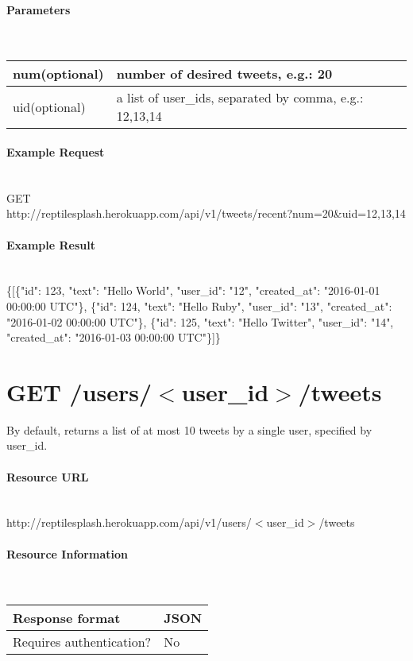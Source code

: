 \documentclass{article}
\begin{document}
	\paragraph{Parameters} \mbox{} \\
	\begin{tabular}{ll}
		\hline
		num(optional) & number of desired tweets, e.g.: 20 \\ \hline
		uid(optional) & a list of user\_ids, separated by comma, e.g.: 12,13,14 \\ \hline
	\end{tabular}
	\paragraph{Example Request} \mbox{} \\
	GET \\
	http://reptilesplash.herokuapp.com/api/v1/tweets/recent?num=20\&uid=12,13,14 
	\paragraph{Example Result} \mbox{} \\
	\{[\{"id": 123, "text": "Hello World", "user\_id": "12", "created\_at": "2016-01-01 00:00:00 UTC"\}, \{"id": 124, "text": "Hello Ruby", "user\_id": "13", "created\_at": "2016-01-02 00:00:00 UTC"\}, \{"id": 125, "text": "Hello Twitter", "user\_id": "14", "created\_at": "2016-01-03 00:00:00 UTC"\}]\}
	

	\section*{GET /users/$<$user\_id$>$/tweets}
	By default, returns a list of at most 10 tweets by a single user, specified by user\_id. 
	\paragraph{Resource URL} \mbox{} \\
	http://reptilesplash.herokuapp.com/api/v1/users/$<$user\_id$>$/tweets
	\paragraph{Resource Information} \mbox{} \\
	\begin{tabular}{ll}
		\hline
		Response format & JSON \\ \hline
		Requires authentication? & No \\ \hline
	\end{tabular}
\end{document}
